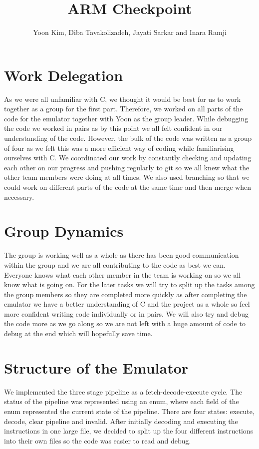 \documentclass[11pt]{article}
\begin{document}
\title{ARM Checkpoint}
\author{Yoon Kim, Diba Tavakolizadeh, Jayati Sarkar and Inara Ramji}

\maketitle

\section{Work Delegation}

As we were all unfamiliar with C, we thought it would be best for us to work together as a group for the first part. Therefore, we worked on all parts of the code for the emulator together with Yoon as the group leader. While debugging the code we worked in pairs as by this point we all felt confident in our understanding of the code. However, the bulk of the code was written as a group of four as we felt this was a more efficient way of coding while familiarising ourselves with C. We coordinated our work by constantly checking and updating each other on our progress and pushing regularly to git so we all knew what the other team members were doing at all times. We also used branching so that we could work on different parts of the code at the same time and then merge when necessary.

\section{Group Dynamics}

The group is working well as a whole as there has been good communication within the group and we are all contributing to the code as best we can. Everyone knows what each other member in the team is working on so we all know what is going on. For the later tasks we will try to split up the tasks among the group members so they are completed more quickly as after completing the emulator we have a better understanding of C and the project as a whole so feel more confident writing code individually or in pairs. We will also try and debug the code more as we go along so we are not left with a huge amount of code to debug at the end which will hopefully save time.

\section{Structure of the Emulator}

We implemented the three stage pipeline as a fetch-decode-execute cycle. The status of the pipeline was represented using an enum, where each field of the enum represented the current state of the pipeline. There are four states: execute, decode, clear pipeline and invalid. After initially decoding and executing the instructions in one large file, we decided to split up the four different instructions into their own files so the code was easier to read and debug.
\end{document}
